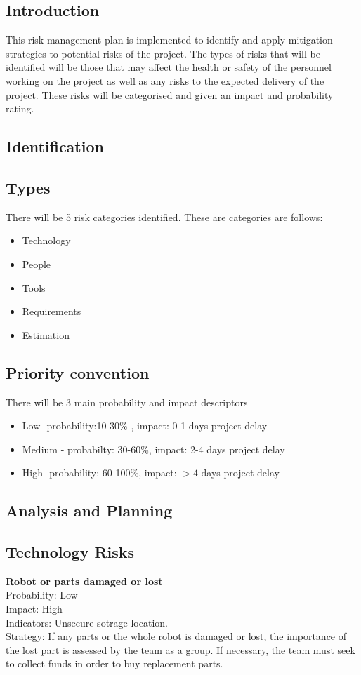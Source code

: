 		\subsection{Introduction}
		This risk management plan is implemented to identify and apply mitigation strategies to potential risks of the project. 
		The types of risks that will be identified will be those that may affect the health or safety of the personnel working on the project as well as 
		any risks to the expected delivery of the project. These risks will be categorised and given an impact and probability rating.
		\subsection{Identification}
			\subsection*{Types}
			There will be 5 risk categories identified. These are categories are follows: 
			\begin{itemize}
			\item Technology
			\item People
			\item Tools
			\item Requirements
			\item Estimation
			\end{itemize}	
			\subsection*{Priority convention}	
			There will be 3 main probability and impact  descriptors
			\begin{itemize}
			\item Low- probability:10-30\% , impact: 0-1 days project delay
			\item Medium - probabilty: 30-60\%, impact: 2-4 days project delay
			\item High- probability: 60-100\%, impact: $>4$ days project delay 
			\end{itemize}			
			
		\subsection{Analysis  and Planning}
			\subsection*{Technology Risks}
			\textbf{Robot or parts damaged or lost}\\
			Probability: Low\\
			Impact: High\\
			Indicators: Unsecure sotrage location.\\
			Strategy: If any parts or the whole robot is damaged or lost, the importance of the lost part is assessed by the team as a group. If necessary, the team must seek to collect funds in order to buy replacement parts.	\\
	
